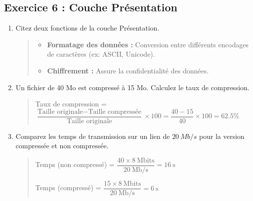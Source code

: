 \documentclass[a4paper,12pt]{article}
\begin{document}
\subsection*{Exercice 6 : Couche Présentation}
\begin{enumerate}
    \item Citez deux fonctions de la couche Présentation.
    \begin{quote}
        \begin{itemize}
            \item \textbf{Formatage des données :} Conversion entre différents encodages de caractères (ex: ASCII, Unicode).
            \item \textbf{Chiffrement :} Assure la confidentialité des données.
        \end{itemize}
    \end{quote}
    \item Un fichier de 40 Mo est compressé à 15 Mo. Calculez le taux de compression.
    \begin{quote}
        Taux de compression = $\dfrac{\text{Taille originale} - \text{Taille compressée}}{\text{Taille originale}} \times 100 = \dfrac{40 - 15}{40} \times 100 = 62.5\%$
    \end{quote}
    \item Comparez les temps de transmission sur un lien de $20~Mb/s$ pour la version compressée et non compressée.
    \begin{quote}
        Temps (non compressé) = $\dfrac{40 \times 8~\text{Mbits}}{20~\text{Mb/s}} = 16~\text{s}$

        Temps (compressé) = $\dfrac{15 \times 8~\text{Mbits}}{20~\text{Mb/s}} = 6~\text{s}$
    \end{quote}
\end{enumerate}
\end{document}
